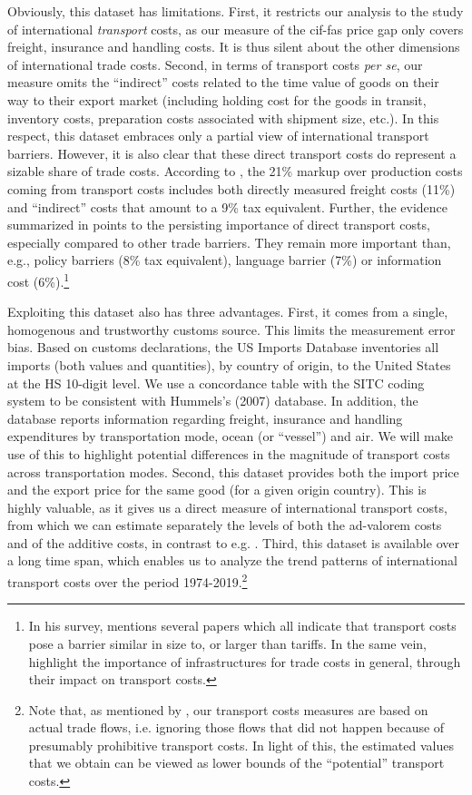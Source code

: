 \documentclass[a4paper,11pt]{article}
\begin{document}
Obviously, this dataset has limitations.
First, it restricts our analysis to the study of international \emph{transport} costs, as our measure of the cif-fas price gap only covers freight, insurance and handling costs.
It is thus silent about the other dimensions of international trade costs.
Second, in terms of transport costs \textit{per se}, our measure omits the ``indirect'' costs related to the time value of goods on their way to their export market (including holding cost for the goods in transit, inventory costs, preparation costs associated with shipment size, etc.).
In this respect, this dataset embraces only a partial view of international transport barriers.
However, it is also clear that these direct transport costs do represent a sizable share of trade costs.
According to \cite{anderson_wincoop_jel}, the 21\% markup over production costs coming from transport costs includes both directly measured freight costs (11\%) and ``indirect'' costs that amount to a  9\% tax equivalent.
Further, the evidence summarized in \cite{anderson_wincoop_jel} points to the persisting importance of direct transport costs, especially compared to other trade barriers.
They remain more important than, e.g., policy barriers (8\% tax equivalent), language barrier (7\%) or information cost (6\%).\footnote{In his survey, \cite{Hummels_1999} mentions several papers which all indicate that transport costs pose a barrier similar in size to, or larger than tariffs.
In the same vein, \cite{limao_venables} highlight the importance of infrastructures for trade costs in general, through their impact on transport costs.}

Exploiting this dataset also has three advantages.
First, it comes from a single, homogenous and trustworthy customs source.
This limits the measurement error bias.
Based on customs declarations, the US Imports Database inventories all imports (both values and quantities), by country of origin, to the United States at the HS 10-digit level. We use a concordance table with the SITC coding system to be consistent with Hummels's (2007) database. In addition, the database reports information regarding freight, insurance and handling expenditures by transportation mode, ocean (or ``vessel'') and air. We will make use of this to highlight potential differences in the magnitude of transport costs across transportation modes.
Second, this dataset provides both the import price and the export price for the same good (for a given origin country).
This is highly valuable, as it gives us a direct measure of international transport costs, from which we can estimate separately the levels of both the ad-valorem costs and of the additive costs, in contrast to e.g. \cite{Irrazabal_2015}.
Third, this dataset is available over a long time span, which enables us to analyze the trend patterns of international transport costs over the period 1974-2019.\footnote{Note that, as mentioned by \cite{Lafourcade_Thisse}, our transport costs measures are based on actual trade flows, i.e. ignoring those flows that did not happen because of presumably prohibitive transport costs.
In light of this, the estimated values that we obtain can be viewed as lower bounds of the ``potential'' transport costs.} \smallskip
\end{document}
